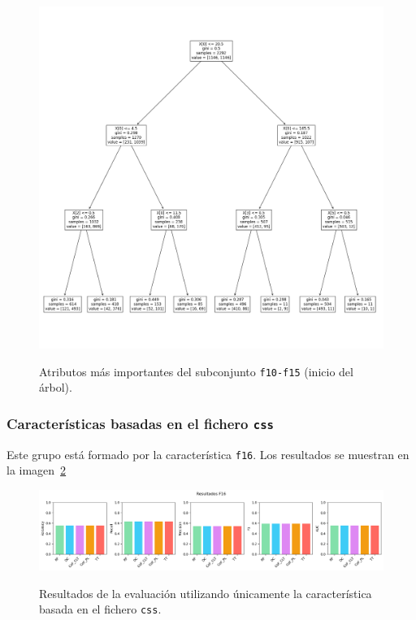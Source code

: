 \begin{figure}[h]
	\caption[\textit{Phishing}: detección (\texttt{f10-f15}, atributos relevantes)]{Atributos más importantes del subconjunto \texttt{f10-f15} (inicio del árbol).}
	\centering
	\includegraphics[width=\textwidth]{../img/memoria/5_phishing/f10f15_tree}
	\label{gr:ph-f10f15_tree}
\end{figure}


\subsubsection{Características basadas en el fichero \texttt{css}}
Este grupo está formado por la característica \texttt{f16}. Los resultados se muestran en la imagen~\ref{gr:ph-f16_small}

\begin{figure}[h]
	\caption[\textit{Phishing}: detección (\texttt{f16})]{Resultados de la evaluación utilizando únicamente la característica basada en el fichero \texttt{css}.}
	\centering
	\includegraphics[width=\textwidth]{../img/memoria/5_phishing/f16_small}
	\label{gr:ph-f16_small}
\end{figure}

